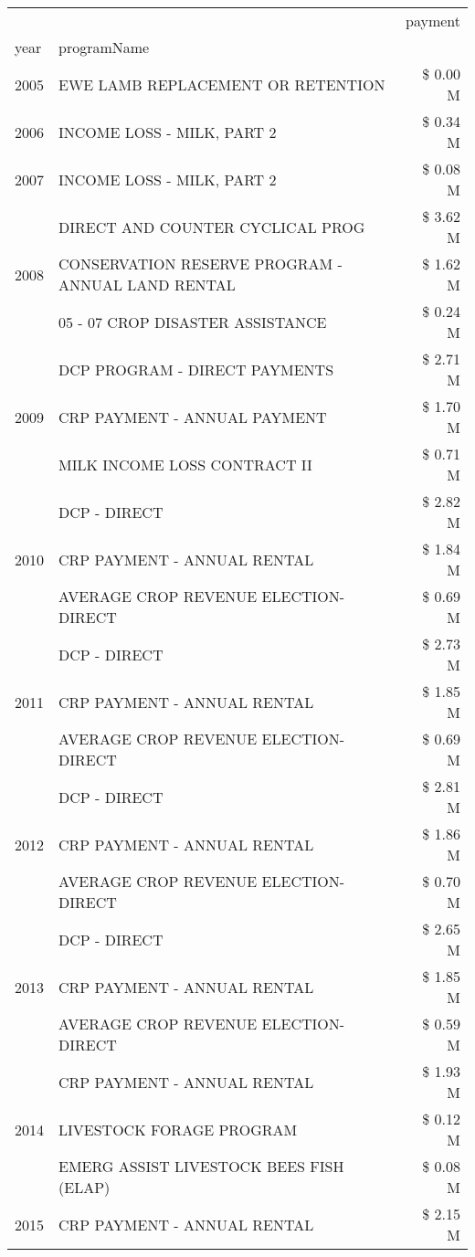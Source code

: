 \begin{tabular}{llr}
\toprule
 &  & payment \\
year & programName &  \\
\midrule
2005 & EWE LAMB REPLACEMENT OR RETENTION & \$ 0.00 M \\
\cline{1-3}
2006 & INCOME LOSS - MILK, PART 2 & \$ 0.34 M \\
\cline{1-3}
2007 & INCOME LOSS - MILK, PART 2 & \$ 0.08 M \\
\cline{1-3}
\multirow[t]{3}{*}{2008} & DIRECT AND COUNTER CYCLICAL PROG & \$ 3.62 M \\
 & CONSERVATION RESERVE PROGRAM - ANNUAL LAND RENTAL & \$ 1.62 M \\
 & 05 - 07 CROP DISASTER ASSISTANCE & \$ 0.24 M \\
\cline{1-3}
\multirow[t]{3}{*}{2009} & DCP PROGRAM - DIRECT PAYMENTS & \$ 2.71 M \\
 & CRP PAYMENT - ANNUAL PAYMENT & \$ 1.70 M \\
 & MILK INCOME LOSS CONTRACT II & \$ 0.71 M \\
\cline{1-3}
\multirow[t]{3}{*}{2010} & DCP - DIRECT & \$ 2.82 M \\
 & CRP PAYMENT - ANNUAL RENTAL & \$ 1.84 M \\
 & AVERAGE CROP REVENUE ELECTION-DIRECT & \$ 0.69 M \\
\cline{1-3}
\multirow[t]{3}{*}{2011} & DCP - DIRECT & \$ 2.73 M \\
 & CRP PAYMENT - ANNUAL RENTAL & \$ 1.85 M \\
 & AVERAGE CROP REVENUE ELECTION-DIRECT & \$ 0.69 M \\
\cline{1-3}
\multirow[t]{3}{*}{2012} & DCP - DIRECT & \$ 2.81 M \\
 & CRP PAYMENT - ANNUAL RENTAL & \$ 1.86 M \\
 & AVERAGE CROP REVENUE ELECTION-DIRECT & \$ 0.70 M \\
\cline{1-3}
\multirow[t]{3}{*}{2013} & DCP - DIRECT & \$ 2.65 M \\
 & CRP PAYMENT - ANNUAL RENTAL & \$ 1.85 M \\
 & AVERAGE CROP REVENUE ELECTION-DIRECT & \$ 0.59 M \\
\cline{1-3}
\multirow[t]{3}{*}{2014} & CRP PAYMENT - ANNUAL RENTAL & \$ 1.93 M \\
 & LIVESTOCK FORAGE PROGRAM & \$ 0.12 M \\
 & EMERG ASSIST LIVESTOCK BEES FISH (ELAP) & \$ 0.08 M \\
\cline{1-3}
\multirow[t]{3}{*}{2015} & CRP PAYMENT - ANNUAL RENTAL & \$ 2.15 M \\

\end{tabular}
